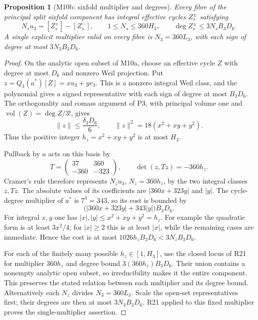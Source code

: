 \documentclass[11pt,a4paper]{article}
\newtheorem{proposition}[theorem]{Proposition}
\theoremstyle{definition}\newtheorem{definition}[theorem]{Definition}
\theoremstyle{remark}\newtheorem{remark}[theorem]{Remark}
\begin{document}
\begin{proposition}[M10b: sixfold multiplier and degrees]\label{M10b}
Every fibre of the principal split sixfold component has integral
effective cycles $Z_s^\pm$ satisfying
\[
 N_su_3=[Z_s^+]-[Z_s^-],\qquad
 1\le N_s\le360H_3,\qquad
 \deg Z_s^\pm\le3N_sB_3D_6.
\]
A single explicit multiplier valid on every fibre is
$N_3=360L_3$, with each sign of degree at most $3N_3B_3D_6$.
\end{proposition}
\begin{proof}
On the analytic open subset of M10a, choose an effective cycle
$Z$ with degree at most $D_6$ and nonzero Weil projection.
Put
$z=Q_3(a^*)[Z]=xu_3+yv_3$.
This is a nonzero integral Weil class, and the polynomial gives
a signed representative with each sign of degree at most $B_3D_6$.
The orthogonality and comass argument of P3, with principal volume
one and $\operatorname{vol}(Z)=\deg Z/3!$, gives
\[
 \|z\|\le\frac{\delta_3D_6}{6},\qquad
 \|z\|^2=18(x^2+xy+y^2).
\]
Thus the positive integer $h_z=x^2+xy+y^2$ is at most $H_3$.

Pullback by $a$ acts on this basis by
\[
 T=\begin{pmatrix}37&360\\-360&-323\end{pmatrix},\qquad
 \det(z,Tz)=-360h_z.
\]
Cramer's rule therefore represents
$N_zu_3$, $N_z=360h_z$, by the two integral classes $z,Tz$.
The absolute values of its coefficients are
$|360x+323y|$ and $|y|$.
The cycle-degree multiplier of $a^*$ is $7^3=343$, so its cost
is bounded by
\[
 \bigl(|360x+323y|+343|y|\bigr)B_3D_6.
\]
For integral $x,y$ one has $|x|,|y|\le x^2+xy+y^2=h_z$.
For example the quadratic form is at least $3x^2/4$; for
$|x|\ge2$ this is at least $|x|$, while the remaining cases are
immediate. Hence the cost is at most
$1026h_zB_3D_6<3N_zB_3D_6$.

For each of the finitely many possible $h_z\in[1,H_3]$, use the
closed locus of R21 for multiplier $360h_z$ and degree bound
$3(360h_z)B_3D_6$. Their union contains a nonempty analytic open
subset, so irreducibility makes it the entire component.
This preserves the stated relation between each multiplier and
its degree bound. Alternatively each $N_z$ divides $N_3=360L_3$.
Scale the open-set representatives first; their degrees are then
at most $3N_3B_3D_6$. R21 applied to this fixed multiplier proves
the single-multiplier assertion.
\end{proof}
\end{document}
